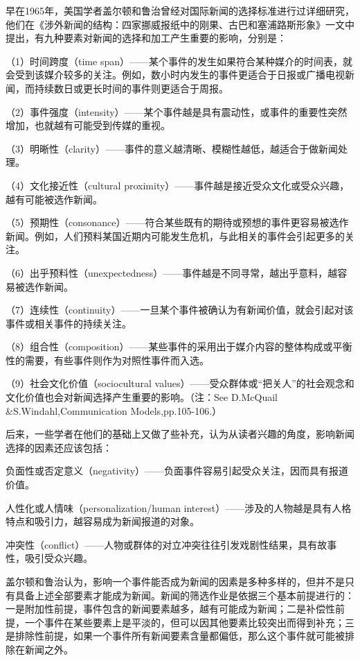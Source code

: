 \documentclass[UTF8,12pt]{ctexart}
\numberwithin{equation}{section} %
\numberwithin{figure}{section}
\numberwithin{table}{section}
\begin{document}
	早在1965年，美国学者盖尔顿和鲁治曾经对国际新闻的选择标准进行过详细研究，他们在《涉外新闻的结构：四家挪威报纸中的刚果、古巴和塞浦路斯形象》一文中提出，有九种要素对新闻的选择和加工产生重要的影响，分别是：
	
	（1）时间跨度（time span）——某个事件的发生如果符合某种媒介的时间表，就会受到该媒介较多的关注。例如，数小时内发生的事件更适合于日报或广播电视新闻，而持续数日或更长时间的事件则更适合于周报。
	
	（2）事件强度（intensity）——某个事件越是具有震动性，或事件的重要性突然增加，也就越有可能受到传媒的重视。
	
	（3）明晰性（clarity）——事件的意义越清晰、模糊性越低，越适合于做新闻处理。
	
	（4）文化接近性（cultural proximity）——事件越是接近受众文化或受众兴趣，越有可能被选作新闻。
	
	（5）预期性（consonance）——符合某些既有的期待或预想的事件更容易被选作新闻。例如，人们预料某国近期内可能发生危机，与此相关的事件会引起更多的关注。
	
	（6）出乎预料性（unexpectedness）——事件越是不同寻常，越出乎意料，越容易被选作新闻。
	
	（7）连续性（continuity）——一旦某个事件被确认为有新闻价值，就会引起对该事件或相关事件的持续关注。
	
	（8）组合性（composition）——某些事件的采用出于媒介内容的整体构成或平衡性的需要，有些事件则作为对照性事件而入选。
	
	（9）社会文化价值（sociocultural values）——受众群体或“把关人”的社会观念和文化价值也会对新闻选择产生重要的影响。（注：See D.McQuail \&S.Windahl,Communication Models,pp.105-106.）
	
	后来，一些学者在他们的基础上又做了些补充，认为从读者兴趣的角度，影响新闻选择的因素还应该包括：
	
	负面性或否定意义（negativity）——负面事件容易引起受众关注，因而具有报道价值。
	
	人性化或人情味（personalization/human interest）——涉及的人物越是具有人格特点和吸引力，越容易成为新闻报道的对象。
	
	冲突性（conflict）——人物或群体的对立冲突往往引发戏剧性结果，具有故事性，吸引受众兴趣。
	
	盖尔顿和鲁治认为，影响一个事件能否成为新闻的因素是多种多样的，但并不是只有具备上述全部要素才能成为新闻。新闻的筛选作业是依据三个基本前提进行的：一是附加性前提，事件包含的新闻要素越多，越有可能成为新闻；二是补偿性前提，一个事件在某些要素上是平淡的，但可以因其他要素比较突出而得到补充；三是排除性前提，如果一个事件所有新闻要素含量都偏低，那么这个事件就可能被排除在新闻之外。
	
\end{document}
